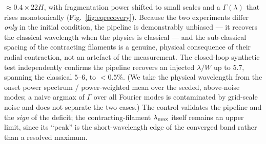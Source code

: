 \documentclass[usenatbib,twoside,twocolumn]{mnras}
\begin{document}
$\approx0.4\times22H$, with fragmentation power shifted to small scales and a $\Gamma(\lambda)$ that rises monotonically (Fig.~\ref{fig:eqrecovery}). Because the two experiments differ \emph{only} in the initial condition, the pipeline is demonstrably unbiased --- it recovers the classical wavelength when the physics is classical --- and the sub-classical spacing of the contracting filaments is a genuine, physical consequence of their radial contraction, not an artefact of the measurement. The closed-loop synthetic test independently confirms the pipeline recovers an injected $\lambda/W$ up to $5.7$, spanning the classical $5$--$6$, to $<0.5\%$. (We take the physical wavelength from the onset power spectrum / power-weighted mean over the seeded, above-noise modes; a naive argmax of $\Gamma$ over all Fourier modes is contaminated by grid-scale noise and does not separate the two cases.) The control validates the pipeline and the \emph{sign} of the deficit; the contracting-filament $\lambda_{\rm max}$ itself remains an upper limit, since its ``peak'' is the short-wavelength edge of the converged band rather than a resolved maximum.
\end{document}
